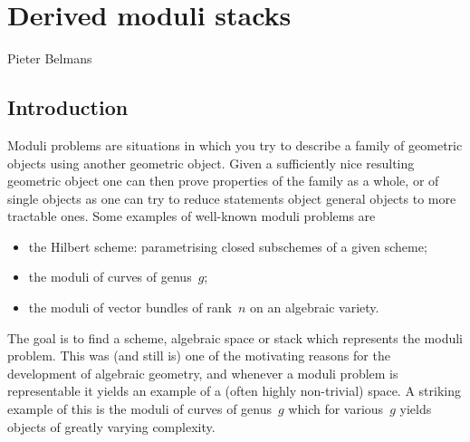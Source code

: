 \chapter{Derived moduli stacks}
\begin{flushright}
  Pieter Belmans
\end{flushright}

\begin{refsection}

\section{Introduction}
Moduli problems are situations in which you try to describe a family of geometric objects using another geometric object. Given a sufficiently nice resulting geometric object one can then prove properties of the family as a whole, or of single objects as one can try to reduce statements object general objects to more tractable ones. Some examples of well-known moduli problems are
\begin{itemize}
  \item the Hilbert scheme: parametrising closed subschemes of a given scheme;
  \item the moduli of curves of genus~$g$;
  \item the moduli of vector bundles of rank~$n$ on an algebraic variety.
\end{itemize}
The goal is to find a scheme, algebraic space or stack which represents the moduli problem. This was (and still is) one of the motivating reasons for the development of algebraic geometry, and whenever a moduli problem is representable it yields an example of a (often highly non-trivial) space. A striking example of this is the moduli of curves of genus~$g$ which for various~$g$ yields objects of greatly varying complexity.


\end{refsection}
